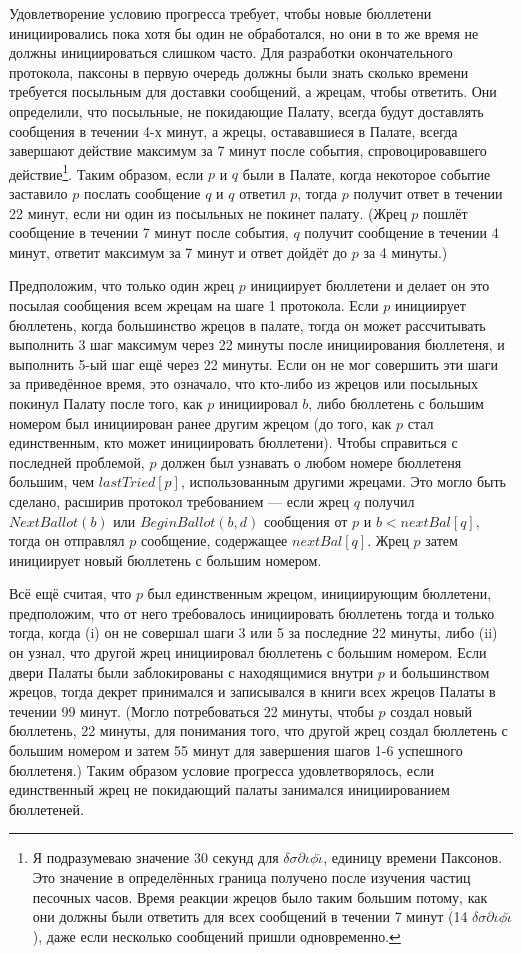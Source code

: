 \documentclass[12pt, a4paper]{article} %
\begin{document}
Удовлетворение условию прогресса требует, чтобы новые бюллетени инициировались пока хотя бы один не обработался, но они в то же время не должны инициироваться слишком часто. Для разработки окончательного протокола, паксоны в первую очередь должны были знать сколько времени требуется посыльным для доставки сообщений, а жрецам, чтобы ответить. Они определили, что посыльные, не покидающие Палату, всегда будут доставлять сообщения в течении 4-х минут, а жрецы, остававшиеся в Палате, всегда завершают действие максимум за 7 минут после события, спровоцировавшего действие\footnote{Я подразумеваю значение 30 секунд для $\delta\sigma\partial\iota\phi\check{\iota}$, единицу времени Паксонов. Это значение в определённых граница получено после изучения частиц песочных часов. Время реакции жрецов было таким большим потому, как они должны были ответить для всех сообщений в течении 7 минут (14 $\delta\sigma\partial\iota\phi\check{\iota}$), даже если несколько сообщений пришли одновременно.}. Таким образом, если $p$ и $q$ были в Палате, когда некоторое событие заставило $p$ послать сообщение $q$ и $q$ ответил $p$, тогда $p$ получит ответ в течении 22 минут, если ни один из посыльных не покинет палату. (Жрец $p$ пошлёт сообщение в течении 7 минут после события, $q$ получит сообщение в течении 4 минут, ответит максимум за 7 минут и ответ дойдёт до $p$ за 4 минуты.)

Предположим, что только один жрец $p$ инициирует бюллетени и делает он это посылая сообщения всем жрецам на шаге 1 протокола. Если $p$ инициирует бюллетень, когда большинство жрецов в палате, тогда он может рассчитывать выполнить 3 шаг максимум через 22 минуты после инициирования бюллетеня, и выполнить 5-ый шаг ещё через 22 минуты. Если он не мог совершить эти шаги за приведённое время, это означало, что кто-либо из жрецов или посыльных покинул Палату после того, как $p$ инициировал $b$, либо бюллетень с большим номером был инициирован ранее другим жрецом (до того, как $p$ стал единственным, кто может инициировать бюллетени). Чтобы справиться с последней проблемой, $p$ должен был узнавать о любом номере бюллетеня большим, чем $lastTried[p]$, использованным другими жрецами. Это могло быть сделано, расширив протокол требованием --- если жрец $q$ получил $NextBallot(b)$ или $BeginBallot(b, d)$ сообщения от $p$ и $b < nextBal[q]$, тогда он отправлял $p$ сообщение, содержащее $nextBal[q]$. Жрец $p$ затем инициирует новый бюллетень с большим номером.

Всё ещё считая, что $p$ был единственным жрецом, инициирующим бюллетени, предположим, что от него требовалось инициировать бюллетень тогда и только тогда, когда (i) он не совершал шаги 3 или 5 за последние 22 минуты, либо (ii) он узнал, что другой жрец инициировал бюллетень с большим номером. Если двери Палаты были заблокированы с находящимися внутри $p$ и большинством жрецов, тогда декрет принимался и записывался в книги всех жрецов Палаты в течении 99 минут. (Могло потребоваться 22 минуты, чтобы $p$ создал новый бюллетень, 22 минуты, для понимания того, что другой жрец создал бюллетень с большим номером и затем 55 минут для завершения шагов 1-6 успешного бюллетеня.) Таким образом условие прогресса удовлетворялось, если единственный жрец не покидающий палаты занимался инициированием бюллетеней.
\end{document}
